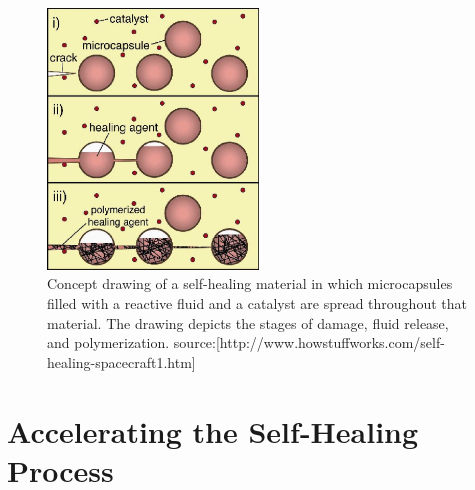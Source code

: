 \begin{figure}[ht!]
\centering
\includegraphics[width=0.5\textwidth]{eps_pics/selfHealingMedium}
\caption{ Concept drawing of a self-healing material in which microcapsules filled with a reactive fluid and a catalyst are spread throughout that material. The drawing depicts the stages of damage, fluid release, and polymerization.
\newline
source:[http://www.howstuffworks.com/self-healing-spacecraft1.htm]
	 \label{fig:selfHealingMedium}} 
\end{figure}

\section{Accelerating the Self-Healing Process}


